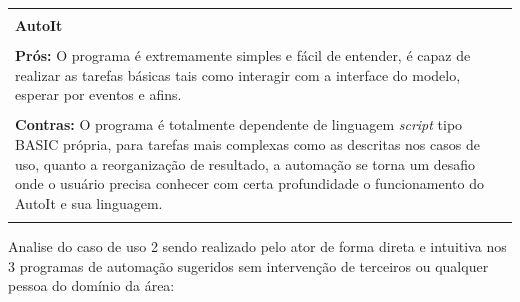 \documentclass[12pt]{article}
\begin{document}
	{\centering \begin{tabular}{ | m{14cm} | }
		 \hline \\
	
		{\bf AutoIt} \\ \\
		{\bf Prós:} O programa é extremamente simples e fácil de entender, é capaz de realizar as tarefas básicas tais como interagir com a interface do modelo, esperar por eventos e afins. \\ \\
		{\bf Contras:}  O programa é totalmente dependente de linguagem \emph{script} tipo BASIC própria, para tarefas mais complexas como as descritas nos casos de uso, quanto a reorganização de resultado, a automação se torna um desafio onde o usuário precisa conhecer com certa profundidade o funcionamento do AutoIt e sua linguagem. \\ \\
		
		\hline
	\end{tabular}}
	
	\bigskip
	Analise do caso de uso 2 sendo realizado pelo ator de forma direta e intuitiva nos 3 programas de automação sugeridos sem intervenção de terceiros ou qualquer pessoa do domínio da área: \\
	\bigskip
	
\end{document}
